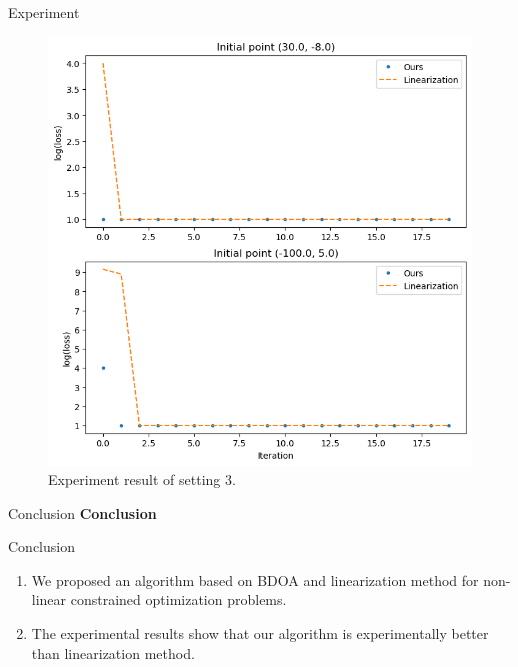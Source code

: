 \documentclass{beamer}
\begin{document}
\begin{frame}{Experiment}
    \begin{figure}[htbp]
    \centerline{\includegraphics [scale=0.3]{./fig/setting3.png}}
    \caption{Experiment result of setting 3.}
    \label{fig3}
    \end{figure}
\end{frame}

\begin{frame}{Conclusion}
    \centering
    \textbf{Conclusion}
\end{frame}
\begin{frame}{Conclusion}
\begin{enumerate}
    \item We proposed an algorithm based on BDOA and linearization method for non-linear constrained optimization problems.
    \item The experimental results show that our algorithm is experimentally better than linearization method.
\end{enumerate}
\end{frame}
\end{document}
